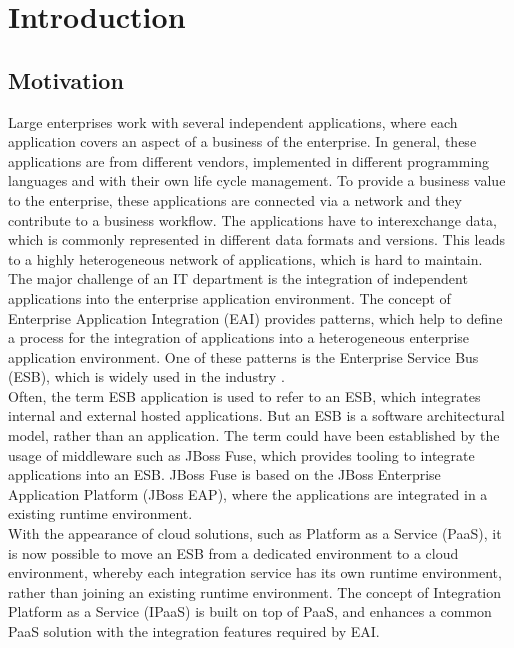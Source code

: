 \chapter{Introduction}
\label{cha:intro}

\section{Motivation}
\label{sec:intro-motivation}
Large enterprises work with several independent applications, where each application covers an aspect of a business of the enterprise. In general, these applications are from different vendors, implemented in different programming languages and with their own life cycle management. To provide a business value to the enterprise, these applications are connected via a network and they contribute to a business workflow. The applications have to interexchange data, which is commonly represented in different data formats and versions. This leads to a highly heterogeneous network of applications, which is hard to maintain. \\

The major challenge of an IT department is the integration of independent applications into the enterprise application environment. The concept of Enterprise Application Integration (EAI) provides patterns, which help to define a process for the integration of applications into a heterogeneous enterprise application environment. One of these patterns is the Enterprise Service Bus (ESB), which is widely used in the industry \cite{EIP}. \\

Often, the term ESB application is used to refer to an ESB, which integrates internal and external hosted applications. But an ESB is a software architectural model, rather than an application. The term could have been established by the usage of middleware such as JBoss Fuse, which provides tooling to integrate applications into an ESB. JBoss Fuse is based on the JBoss Enterprise Application Platform (JBoss EAP), where the applications are integrated in a existing runtime environment\cite{Fuse2018}. \\

With the appearance of cloud solutions, such as Platform as a Service (PaaS), it is now possible to move an ESB from a dedicated environment to a cloud environment, whereby each integration service has its own runtime environment, rather than joining an existing runtime environment. The concept of Integration Platform as a Service (IPaaS) is built on top of PaaS, and enhances a common PaaS solution with the integration features required by EAI\cite{PaaS2015, iPaaSP12015}.

